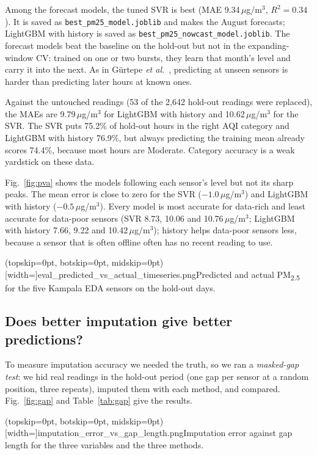 \documentclass{ieeeaccess}
\newcommand{\ugm}{\,$\mu$g/m$^{3}$}
\newcommand{\pmtwo}{PM\textsubscript{2.5}}
\begin{document}
Among the forecast models, the tuned SVR is best (MAE 9.34\ugm, $R^2 = 0.34$). It is saved as \texttt{best\_pm25\_\allowbreak model.joblib} and makes the August forecasts; LightGBM with history is saved as \texttt{best\_pm25\_\allowbreak nowcast\_model.joblib}. The forecast models beat the baseline on the hold-out but not in the expanding-window CV: trained on one or two bursts, they learn that month's level and carry it into the next. As in G\"urtepe \emph{et al.}~\cite{gurtepe2025}, predicting at unseen sensors is harder than predicting later hours at known ones.

Against the untouched readings (53 of the 2{,}642 hold-out readings were replaced), the MAEs are 9.79\ugm{} for LightGBM with history and 10.62\ugm{} for the SVR. The SVR puts 75.2\% of hold-out hours in the right AQI category and LightGBM with history 76.9\%, but always predicting the training mean already scores 74.4\%, because most hours are Moderate. Category accuracy is a weak yardstick on these data.

Fig.~\ref{fig:pva} shows the models following each sensor's level but not its sharp peaks. The mean error is close to zero for the SVR ($-1.0$\ugm) and LightGBM with history ($-0.5$\ugm). Every model is most accurate for data-rich and least accurate for data-poor sensors (SVR 8.73, 10.06 and 10.76\ugm; LightGBM with history 7.66, 9.22 and 10.42\ugm); history helps data-poor sensors less, because a sensor that is often offline often has no recent reading to use.

\Figure[t!](topskip=0pt, botskip=0pt, midskip=0pt)[width=\textwidth]{eval_predicted_vs_actual_timeseries.png}{Predicted and actual \pmtwo{} for the five Kampala EDA sensors on the hold-out days.\label{fig:pva}}

\subsection{Does better imputation give better predictions?}
\label{sec:impeval}
To measure imputation accuracy we needed the truth, so we ran a \emph{masked-gap test}: we hid real readings in the hold-out period (one gap per sensor at a random position, three repeats), imputed them with each method, and compared. Fig.~\ref{fig:gap} and Table~\ref{tab:gap} give the results.

\Figure[t!](topskip=0pt, botskip=0pt, midskip=0pt)[width=\textwidth]{imputation_error_vs_gap_length.png}{Imputation error against gap length for the three variables and the three methods.\label{fig:gap}}
\end{document}
